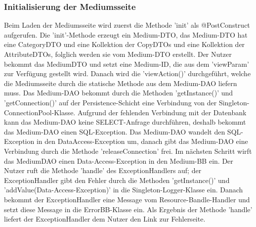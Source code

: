 \documentclass{article}
\begin{document}
\subsubsection{Initialisierung der Mediumsseite}
Beim Laden der Mediumsseite wird zuerst die Methode 'init' als @PostConstruct aufgerufen. Die 'init'-Methode erzeugt ein Medium-DTO, das Medium-DTO hat eine CategoryDTO und eine Kollektion der CopyDTOs und eine Kollektion der AttributeDTOs, folglich werden sie vom Medium-DTO erstellt. Der Nutzer bekommt das MediumDTO und setzt eine Medium-ID, die aus dem 'viewParam' zur Verfügung gestellt wird. Danach wird die 'viewAction()' durchgeführt, welche die Mediumsseite durch die statische Methode aus dem Medium-DAO liefern muss. Das Medium-DAO bekommt durch die Methoden 'getInstance()' und 'getConnection()' auf der Persistence-Schicht eine Verbindung von der Singleton-ConnectionPool-Klasse. Aufgrund der fehlenden Verbindung mit der Datenbank kann das Medium-DAO keine SELECT-Anfrage durchführen, deshalb bekommt das Medium-DAO einen SQL-Exception. Das Medium-DAO wandelt den SQL-Exception in den DataAccess-Exception um, danach gibt das Medium-DAO eine Verbindung durch die Methode 'releaseConnection' frei. Im nächsten Schritt wirft das MediumDAO einen Data-Access-Exception in den Medium-BB ein. Der Nutzer ruft die Methode 'handle' des ExceptionHandlers auf; der ExceptionHandler gibt den Fehler durch die Methoden 'getInstance()' und 'addValue(Data-Access-Exception)' in die Singleton-Logger-Klasse ein. Danach bekommt der ExceptionHandler eine Message vom Resource-Bandle-Handler und setzt diese Message in die ErrorBB-Klasse ein. Als Ergebnis der Methode 'handle' liefert der ExceptionHandler dem Nutzer den Link zur Fehlerseite.

\newpage

\end{document}

